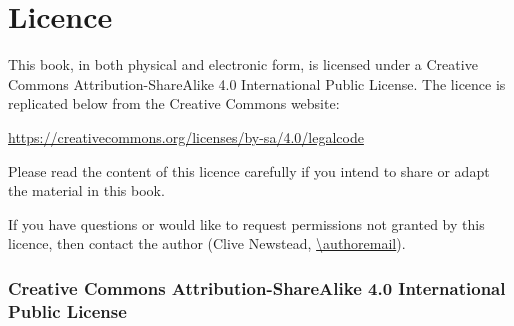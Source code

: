 \chapter*{Licence}

\renewcommand\chaptername{Licence}

This book, in both physical and electronic form, is licensed under a Creative Commons Attribution-ShareAlike 4.0 International Public License. The licence is replicated below from the Creative Commons website:
\begin{center}
\url{https://creativecommons.org/licenses/by-sa/4.0/legalcode}
\end{center}
Please read the content of this licence carefully if you intend to share or adapt the material in this book.

If you have questions or would like to request permissions not granted by this licence, then contact the author (Clive Newstead, \url{\authoremail}).

\subsection*{Creative Commons Attribution-ShareAlike 4.0 International Public License}

